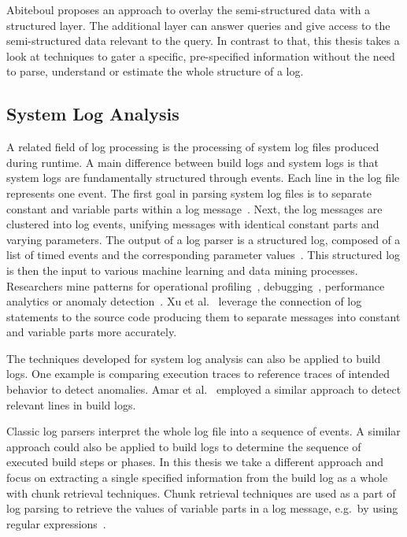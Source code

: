\documentclass[\myrootdir/main.tex]{subfiles}
\begin{document}
Abiteboul proposes an approach to overlay the semi-structured data with a structured layer.
The additional layer can answer queries and give access to the semi-structured data relevant to the query.
In contrast to that, this thesis takes a look at techniques to gater a specific, pre-specified information without the need to parse, understand or estimate the whole structure of a log.

\subsection{System Log Analysis}
\label{sec:log-analysis}
A related field of log processing is the processing of system log files produced during runtime.
A main difference between build logs and system logs is that system logs are fundamentally structured through events.
Each line in the log file represents one event.
The first goal in parsing system log files is to separate constant and variable parts within a log message~\cite{nagappan2010abstracting,he2017towards}.
Next, the log messages are clustered into log events, unifying messages with identical constant parts and varying parameters.
The output of a log parser is a structured log, composed of a list of timed events and the corresponding parameter values~\cite{he2016evaluation}.
This structured log is then the input to various machine learning and data mining processes.
Researchers mine patterns for operational profiling~\cite{nagappan2009efficiently}, debugging~\cite{oliner2012advances}, performance analytics or anomaly detection~\cite{nagappan2010abstracting}.
Xu et al.~\cite{xu2009detecting} leverage the connection of log statements to the source code producing them to separate messages into constant and variable parts more accurately.

The techniques developed for system log analysis can also be applied to build logs.
One example is comparing execution traces to reference traces of intended behavior to detect anomalies.
Amar et al.~\cite{amar2019mining} employed a similar approach to detect relevant lines in build logs.

Classic log parsers interpret the whole log file into a sequence of events.
A similar approach could also be applied to build logs to determine the sequence of executed build steps or phases.
In this thesis we take a different approach and focus on extracting a single specified information from the build log as a whole with chunk retrieval techniques.
Chunk retrieval techniques are used as a part of log parsing to retrieve the values of variable parts in a log message, e.g.\ by using regular expressions~\cite{nagappan2010abstracting,xu2009detecting}.
\end{document}
